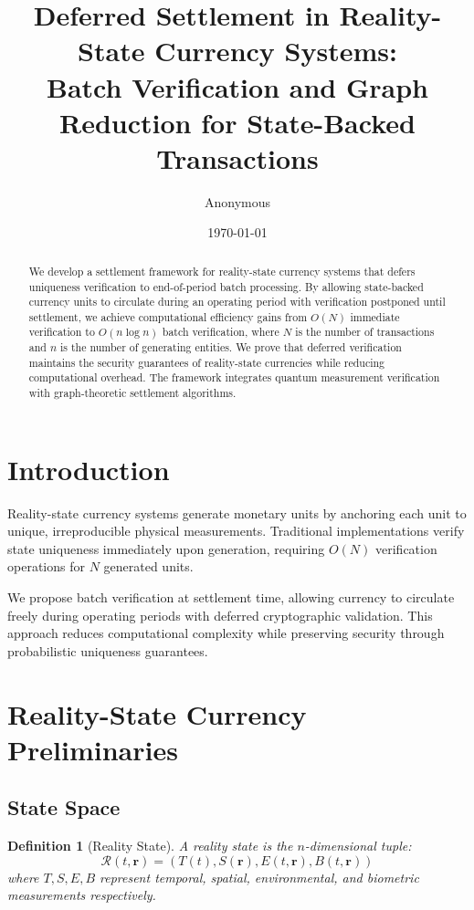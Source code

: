 \documentclass[12pt]{article}
\title{Deferred Settlement in Reality-State Currency Systems:\\
Batch Verification and Graph Reduction for State-Backed Transactions}
\author{Anonymous}
\date{\today}
\newtheorem{definition}[theorem]{Definition}
\begin{document}
\maketitle

\begin{abstract}
We develop a settlement framework for reality-state currency systems that defers uniqueness verification to end-of-period batch processing. By allowing state-backed currency units to circulate during an operating period with verification postponed until settlement, we achieve computational efficiency gains from $O(N)$ immediate verification to $O(n\log n)$ batch verification, where $N$ is the number of transactions and $n$ is the number of generating entities. We prove that deferred verification maintains the security guarantees of reality-state currencies while reducing computational overhead. The framework integrates quantum measurement verification with graph-theoretic settlement algorithms.
\end{abstract}

\section{Introduction}

Reality-state currency systems generate monetary units by anchoring each unit to unique, irreproducible physical measurements. Traditional implementations verify state uniqueness immediately upon generation, requiring $O(N)$ verification operations for $N$ generated units.

We propose batch verification at settlement time, allowing currency to circulate freely during operating periods with deferred cryptographic validation. This approach reduces computational complexity while preserving security through probabilistic uniqueness guarantees.

\section{Reality-State Currency Preliminaries}

\subsection{State Space}

\begin{definition}[Reality State]
A reality state is the $n$-dimensional tuple:
$$
\mathcal{R}(t,\mathbf{r}) = (T(t), S(\mathbf{r}), E(t,\mathbf{r}), B(t,\mathbf{r}))
$$
where $T,S,E,B$ represent temporal, spatial, environmental, and biometric measurements respectively.
\end{definition}
\end{document}
